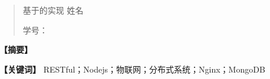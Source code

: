 
\renewcommand\abstractname{{\fontsize{18}{21.6} \selectfont \CJKfamily{ZS} 论文题目}}
\begin{abstract}


\centerline{{\fontsize{10.5}{10.5} \selectfont {} 基于的实现\hspace{2pt} 姓名}}

\centerline{{\fontsize{9}{9} \selectfont {} 学号：}}
\end{abstract}

\vspace{1em}



{\noindent \fontsize{12}{12} \selectfont {} \textbf{【摘要】}}
{\fontsize{10.5}{10.5} \selectfont {}

}

\vspace{1em}

{\noindent \fontsize{12}{12} \selectfont {} \textbf{【关键词】}}
{\fontsize{10.5}{10.5} \selectfont {}
RESTful；Nodejs；物联网；分布式系统；Nginx；MongoDB
}

